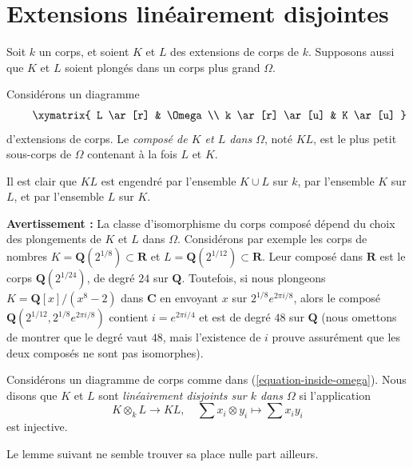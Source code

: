 \section{Extensions linéairement disjointes}
\label{section-linearly-disjoint}

\noindent
Soit $k$ un corps, et soient $K$ et $L$ des extensions de corps de $k$.
Supposons aussi que $K$ et $L$ soient plongés dans un corps plus grand $\Omega$.

\begin{definition}
\label{definition-compositum}
Considérons un diagramme
\begin{equation}
\label{equation-inside-omega}
\vcenter{
\xymatrix{
L \ar[r] & \Omega \\
k \ar[r] \ar[u] & K \ar[u]
}
}
\end{equation}
d'extensions de corps. Le {\it composé de $K$ et $L$ dans $\Omega$},
noté $KL$, est le plus petit sous-corps de $\Omega$ contenant à la fois
$L$ et $K$.
\end{definition}

\noindent
Il est clair que $KL$ est engendré par l'ensemble $K \cup L$ sur $k$,
par l'ensemble $K$ sur $L$, et par l'ensemble $L$ sur $K$.

\medskip\noindent
{\bf Avertissement :} La classe d'isomorphisme du corps composé dépend du
choix des plongements de $K$ et $L$ dans $\Omega$. Considérons par exemple
les corps de nombres $K = \mathbf{Q}(2^{1/8}) \subset \mathbf{R}$ et
$L = \mathbf{Q}(2^{1/12}) \subset \mathbf{R}$. Leur composé dans
$\mathbf{R}$ est le corps $\mathbf{Q}(2^{1/24})$, de degré $24$ sur
$\mathbf{Q}$. Toutefois, si nous plongeons $K = \mathbf{Q}[x]/(x^8 - 2)$ dans
$\mathbf{C}$ en envoyant $x$ sur $2^{1/8}e^{2\pi i/8}$, alors le composé
$\mathbf{Q}(2^{1/12}, 2^{1/8}e^{2\pi i/8})$ contient $i = e^{2\pi i/4}$ et est de
degré $48$ sur $\mathbf{Q}$ (nous omettons de montrer que le degré vaut $48$, mais
l'existence de $i$ prouve assurément que les deux composés ne sont pas isomorphes).

\begin{definition}
\label{definition-linearly-disjoint}
Considérons un diagramme de corps comme dans (\ref{equation-inside-omega}).
Nous disons que $K$ et $L$ sont {\it linéairement disjoints sur $k$ dans $\Omega$}
si l'application
$$
K \otimes_k L \longrightarrow KL,\quad
\sum x_i \otimes y_i \longmapsto \sum x_i y_i
$$
est injective.
\end{definition}

\noindent
Le lemme suivant ne semble trouver sa place nulle part ailleurs.

